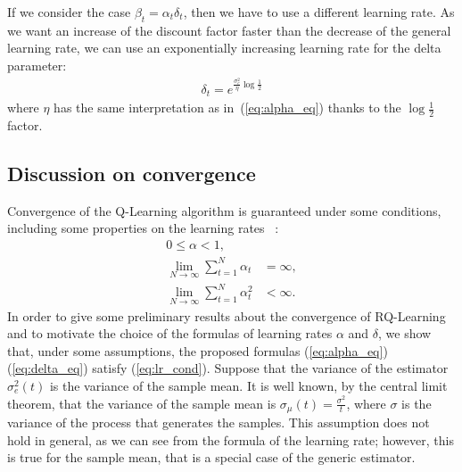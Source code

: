 If we consider the case $\beta_t=\alpha_t\delta_t$, then we have to use a different learning rate. As we want an increase of the discount factor faster than the decrease of the general learning rate, we can use an exponentially increasing learning rate for the delta parameter:
\begin{align}\label{eq:delta_eq}
 \delta_t = e^{\frac{\sigma_e^2}{\eta}\log\frac{1}{2}}
\end{align}
where $\eta$ has the same interpretation as in~(\ref{eq:alpha_eq}) thanks to the $\log\frac{1}{2}$ factor.

\subsection{Discussion on convergence}
Convergence of the Q-Learning algorithm is guaranteed under some conditions, including some properties on the learning rates ~\cite{EvenDar2001, watkins1989learning}:
\begin{align}
 0 \leq \alpha < 1,\nonumber \\
 \lim_{N\rightarrow\infty} \sum_{t=1}^{N}\alpha_t & = \infty,\nonumber \\
 \lim_{N\rightarrow\infty} \sum_{t=1}^{N}\alpha_t^2 & < \infty. \label{eq:lr_cond}
\end{align}
In order to give some preliminary results about the convergence of RQ-Learning and to motivate the choice of the formulas of learning rates $\alpha$ and $\delta$, we show that, under some assumptions, the proposed formulas (\ref{eq:alpha_eq}) (\ref{eq:delta_eq}) satisfy (\ref{eq:lr_cond}). Suppose that the variance of the estimator $\sigma_e^2(t)$ is the variance of the sample mean. It is well known, by the central limit theorem, that the variance of the sample mean is $\sigma_{\mu}(t)=\frac{\sigma^2}{t}$, where $\sigma$ is the variance of the process that generates the samples.
This assumption does not hold in general, as we can see from the formula of the learning rate; however, this is true for the sample mean, that is a special case of the generic estimator.

